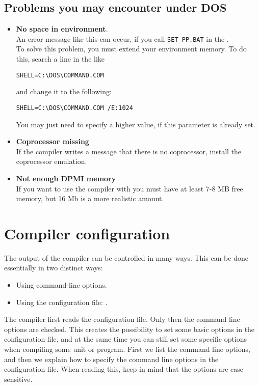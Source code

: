 \section{Problems you may encounter under DOS}
\begin{itemize}
\item \textbf{No space in environment}.\\
An error message like this can occur, if you call
\verb|SET_PP.BAT| in the .\\
To solve this problem, you must extend your environment memory.
To do this, search a line in the  like
\begin{verbatim}
SHELL=C:\DOS\COMMAND.COM
\end{verbatim}
and change it to the following:
\begin{verbatim}
SHELL=C:\DOS\COMMAND.COM /E:1024
\end{verbatim}
You may just need to specify a higher value, if this parameter is already set.
\item \textbf{ Coprocessor missing}\\
If the compiler writes
a message that there is no coprocessor, install
the coprocessor emulation.
\item \textbf{Not enough DPMI memory}\\
If you want to use the compiler with  you must have at least
7-8 MB free  memory, but 16 Mb is a more realistic amount.
\end{itemize}



\chapter{Compiler configuration}
\label{ch:CompilerConfiguration}

The output of the compiler can be controlled in many ways. This can be done
essentially in two distinct ways:
\begin{itemize}
\item Using command-line options.
\item Using the configuration file: .
\end{itemize}
The compiler first reads the configuration file. Only then the command line
options are checked. This creates the possibility to set some basic options
in the configuration file, and at the same time you can still set some
specific options when compiling some unit or program. First we list the
command line options, and then we explain how to specify the command
line options in the configuration file. When reading this, keep in mind
that the options are case sensitive. 


